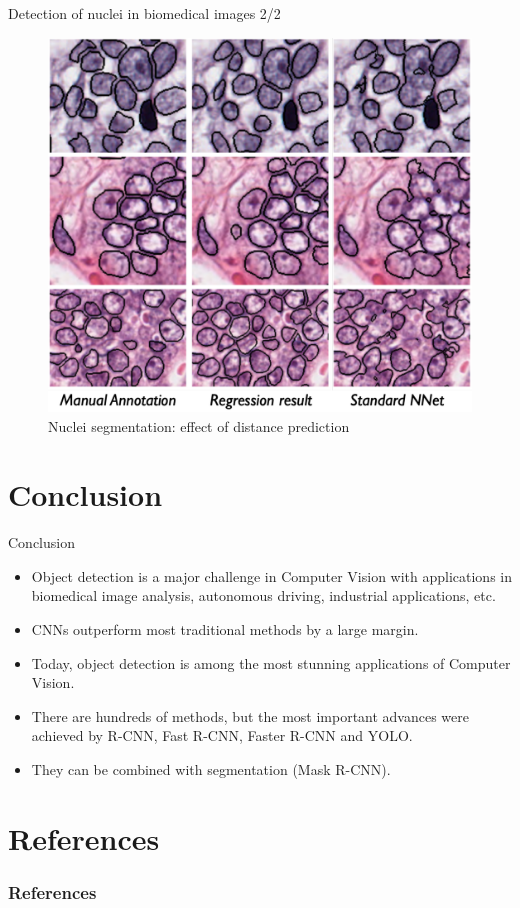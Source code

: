 \documentclass[xcolor=pdftex,dvipsnames,table]{beamer}
\begin{document}
\begin{frame}{Detection of nuclei in biomedical images 2/2}
\begin{figure}[htb]
   \centering
   \includegraphics[width=.7\textwidth]{../graphics/Nuclei_Detection2.pdf}
   \caption{Nuclei segmentation: effect of distance prediction}
\end{figure}
\end{frame}


\section{Conclusion}

\begin{frame}{Conclusion}
\begin{itemize}
\item Object detection is a major challenge in Computer Vision with applications in biomedical image analysis, autonomous driving, industrial applications, etc.
\item CNNs outperform most traditional methods by a large margin. 
\item Today, object detection is among the most stunning applications of Computer Vision. 
\item There are hundreds of methods, but the most important advances were achieved by R-CNN, Fast R-CNN, Faster R-CNN and YOLO. 
\item They can be combined with segmentation (Mask R-CNN). 
\end{itemize}
\end{frame}



\section{References}
\begin{frame}[allowframebreaks]
	\frametitle{References}
	
\end{frame}
\end{document}
